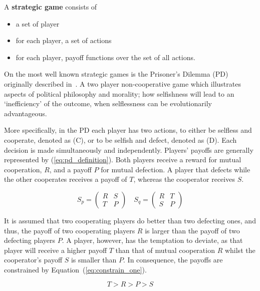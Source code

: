 \begin{definition}
A \textbf{strategic game} consists of
\begin{itemize}
    \item a set of player
    \item for each player, a set of actions
    \item for each player, payoff functions over the set of all actions.
\end{itemize}
\end{definition}

On the most well known strategic games is the Prisoner's Dilemma (PD) originally
described in~\cite{Flood1958}. A two player non-cooperative game which
illustrates aspects of political philosophy and morality; how selfishness will
lead to an `inefficiency' of the outcome, when selflessness can be
evolutionarily advantageous.

More specifically, in the PD each player has two actions, to either be selfless
and cooperate, denoted as (C), or to be selfish and defect, denoted as (D). Each
decision is made simultaneously and independently. Players' payoffs are
generally represented by (\ref{eq:pd_definition}). Both players receive a reward
for mutual cooperation, \(R\), and a payoff \(P\) for mutual defection. A player
that defects while the other cooperates receives a payoff of \(T\), whereas the
cooperator receives \(S\).

\begin{equation}\label{eq:pd_definition}
    S_p =
    \begin{pmatrix}
        R & S  \\
        T & P
    \end{pmatrix}
    \quad
    S_q =
    \begin{pmatrix}
        R & T  \\
        S & P
    \end{pmatrix}
\end{equation}

It is assumed that two cooperating players do better than two defecting ones,
and thus, the payoff of two cooperating players \(R\) is
larger than the payoff of two defecting players \(P\). A player, however, has the
temptation to deviate, as that player will receive a higher payoff \(T\) than
that of mutual cooperation \(R\) whilst the cooperator's payoff \(S\) is smaller than
\(P\). In consequence, the payoffs are constrained by
Equation~(\ref{eq:constrain_one}).

\begin{equation}\label{eq:constrain_one}
    T > R > P > S
\end{equation}

